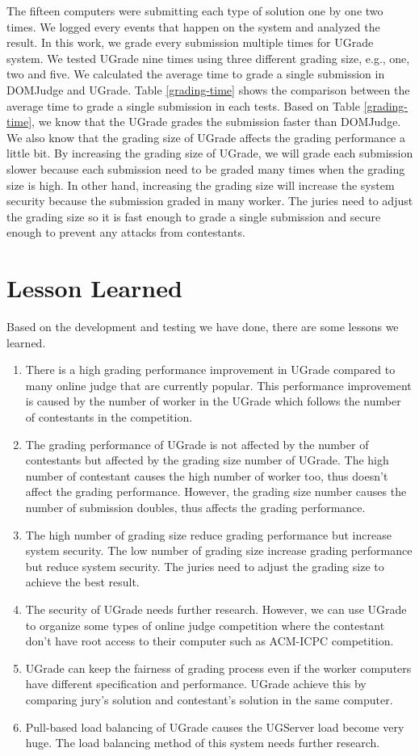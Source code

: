 \documentclass[conference]{IEEEtran}
\begin{document}
The fifteen computers were submitting each type of solution one by one two times. We logged every events that happen on the system and analyzed the result. In this work, we grade every submission multiple times for UGrade system. We tested UGrade nine times using three different grading size, e.g., one, two and five. We calculated the average time to grade a single submission in DOMJudge and UGrade. Table \ref{grading-time} shows the comparison between the average time to grade a single submission in each tests. Based on Table \ref{grading-time}, we know that the UGrade grades the submission faster than DOMJudge. We also know that the grading size of UGrade affects the grading performance a little bit. By increasing the grading size of UGrade, we will grade each submission slower because each submission need to be graded many times when the grading size is high. In other hand, increasing the grading size will increase the system security because the submission graded in many worker. The juries need to adjust the grading size so it is fast enough to grade a single submission and secure enough to prevent any attacks from contestants.

\section{Lesson Learned}

Based on the development and testing we have done, there are some lessons we learned.
\begin{enumerate}
    \item There is a high grading performance improvement in UGrade compared to many online judge that are currently popular. This performance improvement is caused by the number of worker in the UGrade which follows the number of contestants in the competition.
    \item The grading performance of UGrade is not affected by the number of contestants but affected by the grading size number of UGrade. The high number of contestant causes the high number of worker too, thus doesn't affect the grading performance. However, the grading size number causes the number of submission doubles, thus affects the grading performance.
    \item The high number of grading size reduce grading performance but increase system security. The low number of grading size increase grading performance but reduce system security. The juries need to adjust the grading size to achieve the best result.
    \item The security of UGrade needs further research. However, we can use UGrade to organize some types of online judge competition where the contestant don't have root access to their computer such as ACM-ICPC competition.
    \item UGrade can keep the fairness of grading process even if the worker computers have different specification and performance. UGrade achieve this by comparing jury's solution and contestant's solution in the same computer.
    \item Pull-based load balancing of UGrade causes the UGServer load become very huge. The load balancing method of this system needs further research.
\end{enumerate}
\end{document}
